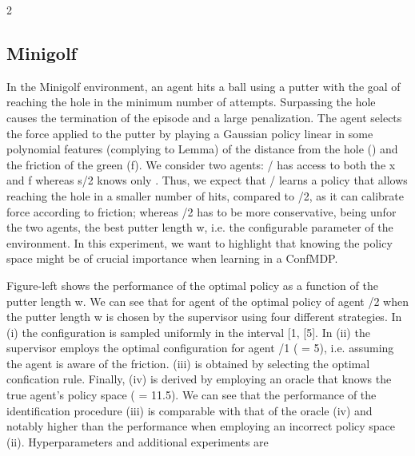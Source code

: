 \documentclass{article}
\begin{document}
\begin{paracol}{2}
\subsection*{Minigolf}


In the Minigolf environment, an agent hits a ball using a putter with the goal of reaching the hole in the minimum number of attempts. Surpassing the hole causes the termination
of the episode and a large penalization. The agent selects the
force applied to the putter by playing a Gaussian policy linear in some polynomial features (complying to Lemma) of
the distance from the hole () and the friction of the green
(f). We consider two agents: / has access to both the x and
f whereas s/2 knows only . Thus, we expect that / learns
a policy that allows reaching the hole in a smaller number of
hits, compared to /2, as it can calibrate force according to
friction; whereas /2 has to be more conservative, being unfor the two agents, the best putter length w, i.e. the configurable parameter of the environment. In this experiment, we
want to highlight that knowing the policy space might be of
crucial importance when learning in a ConfMDP.


Figure-left shows the performance of the optimal policy
as a function of the putter length w. We can see that for agent
of the optimal policy of agent /2 when the putter length w
is chosen by the supervisor using four different strategies.
In (i) the configuration is sampled uniformly in the interval
[1, [5]. In (ii) the supervisor employs the optimal configuration for agent /1 ( = 5), i.e. assuming the agent is aware
of the friction. (iii) is obtained by selecting the optimal confication rule. Finally, (iv) is derived by employing an oracle
that knows the true agent's policy space ( = 11.5). We can
see that the performance of the identification procedure (iii)
is comparable with that of the oracle (iv) and notably higher
than the performance when employing an incorrect policy
space (ii). Hyperparameters and additional experiments are

\end{paracol}
\end{document}
